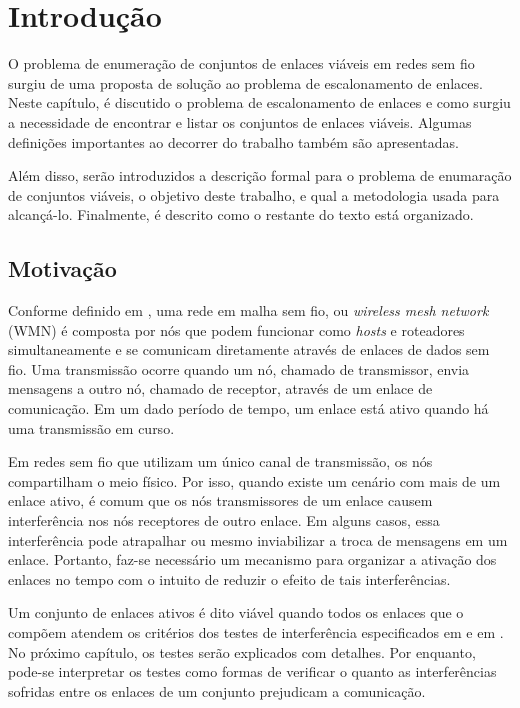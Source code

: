 \chapter{Introdução}
\label{cap:introducao}

O problema de enumeração de conjuntos de enlaces viáveis em redes sem fio surgiu de uma proposta de solução ao problema de escalonamento de enlaces. Neste capítulo, é discutido o problema de escalonamento de enlaces e como surgiu a necessidade de encontrar e listar os conjuntos de enlaces viáveis. Algumas definições importantes ao decorrer do trabalho também são apresentadas. 

Além disso, serão introduzidos a descrição formal para o problema de enumaração de conjuntos viáveis, o objetivo deste trabalho, e qual a metodologia usada para alcançá-lo. Finalmente, é descrito como o restante do texto está organizado.

\section{Motivação}

Conforme definido em \cite{mesh}, uma rede em malha sem fio, ou {\it wireless mesh network} (WMN) é composta por nós que podem funcionar como {\it hosts} e roteadores simultaneamente e se comunicam diretamente através de enlaces de dados sem fio. Uma transmissão ocorre quando um nó, chamado de transmissor, envia mensagens a outro nó, chamado de receptor, através de um enlace de comunicação. Em um dado período de tempo, um enlace está ativo quando há uma transmissão em curso.

Em redes sem fio que utilizam um único canal de transmissão, os nós compartilham o meio físico. Por isso, quando existe um cenário com mais de um enlace ativo, é comum que os nós transmissores de um enlace causem interferência nos nós receptores de outro enlace. Em alguns casos, essa interferência pode atrapalhar ou mesmo inviabilizar a troca de mensagens em um enlace. Portanto, faz-se necessário um mecanismo para organizar a ativação dos enlaces no tempo com o intuito de reduzir o efeito de tais interferências.

Um conjunto de enlaces ativos é dito viável quando todos os enlaces que o compõem atendem os critérios dos testes de interferência especificados em \cite{primary} e em \cite{secondary}. No próximo capítulo, os testes serão explicados com detalhes. Por enquanto, pode-se interpretar os testes como formas de verificar o quanto as interferências sofridas entre os enlaces de um conjunto prejudicam a comunicação.

